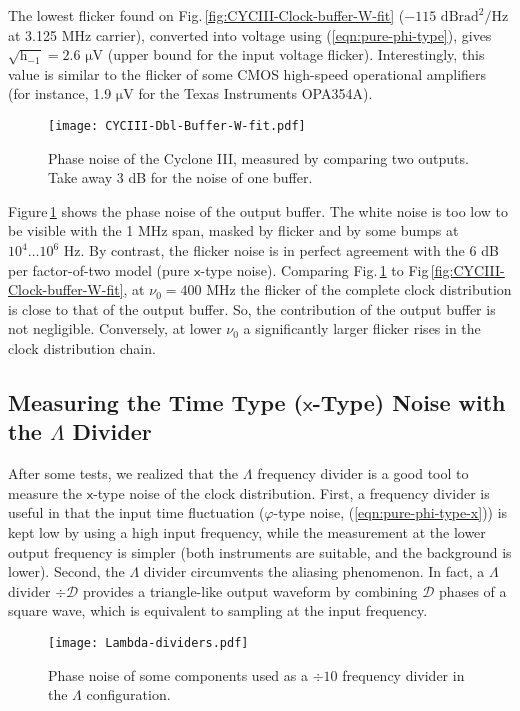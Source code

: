 \documentclass{article}
\newcommand{\unit}[1]{\ensuremath{\mathrm{#1}}}
\newcommand{\req}[1]{(\ref{#1})}
\begin{document}
The lowest flicker found on Fig.\,\ref{fig:CYCIII-Clock-buffer-W-fit} ($-115$ \unit{dBrad^2/Hz} at 3.125 MHz carrier), converted into voltage using \req{eqn:pure-phi-type}, gives $\sqrt{\mathrm{h}_{-1}}=2.6$ \unit{\mu V} (upper bound for the input voltage flicker).  Interestingly, this value is similar to the flicker of some CMOS high-speed operational amplifiers (for instance, 1.9 \unit{\mu V} for the Texas Instruments OPA354A).



\begin{figure}[t]
\centering
\texttt{[image: CYCIII-Dbl-Buffer-W-fit.pdf]}
\caption{Phase noise of the Cyclone III, measured by comparing two outputs.  Take away 3 dB for the noise of one buffer.}
\label{fig:CYCIII-Dbl-Buffer-commented}
\end{figure}

Figure\,\ref{fig:CYCIII-Dbl-Buffer-commented} shows the phase noise of the output buffer.  The white noise is too low to be visible with the 1 MHz span, masked by flicker and by some bumps at $10^4\ldots10^6$ Hz.
By contrast, the flicker noise is in perfect agreement with the 6 dB per factor-of-two model (pure $\mathsf{x}$-type noise).
Comparing 
Fig.\,\ref{fig:CYCIII-Dbl-Buffer-commented} to 
Fig\,\ref{fig:CYCIII-Clock-buffer-W-fit}, at $\nu_0=400$ MHz the flicker of the complete clock distribution is close to that of the output buffer.  So, the contribution of the output buffer is not negligible.
Conversely, at lower $\nu_0$ a significantly larger flicker rises in the clock distribution chain.



\subsection{Measuring the Time Type ($\mathsf{x}$-Type) Noise with the $\Lambda$ Divider}
After some tests, we realized that the $\Lambda$ frequency divider \cite{Calosso-2013} is a good tool to measure the $\mathsf{x}$-type noise of the clock distribution.  First, a frequency divider is useful in that the input time fluctuation ($\varphi$-type noise, \req{eqn:pure-phi-type-x}) is kept low by using a high input frequency, while the measurement at the lower output frequency is simpler (both instruments are suitable, and the background is lower).
Second, the $\Lambda$ divider circumvents the aliasing phenomenon.  In fact, a $\Lambda$ divider $\div\mathcal{D}$ provides a triangle-like output waveform by combining $\mathcal{D}$ phases of a square wave, which is equivalent to sampling at the input frequency. 
%
\begin{figure}
\centering
\texttt{[image: Lambda-dividers.pdf]}
\caption{Phase noise of some components used as a $\div10$ frequency divider in the $\Lambda$ configuration.}
\label{fig:Lambda-dividers}
\end{figure}
\end{document}
